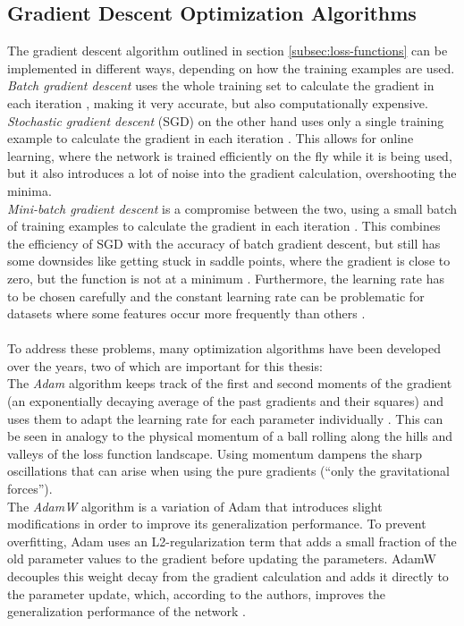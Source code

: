 \subsection{Gradient Descent Optimization Algorithms}
\label{subsec:sgd}
The gradient descent algorithm outlined in section \ref{subsec:loss-functions} can be implemented in different ways, depending on how the training examples are used. 
\\
\textit{Batch gradient descent} uses the whole training set to calculate the gradient in each iteration \cite{ruder_overview_2017}, making it very accurate, but also computationally expensive. \textit{Stochastic gradient descent} (SGD) on the other hand uses only a single training example to calculate the gradient in each iteration \cite{ruder_overview_2017}. This allows for online learning, where the network is trained efficiently on the fly while it is being used, but it also introduces a lot of noise into the gradient calculation, overshooting the minima. 
\\
\textit{Mini-batch gradient descent} is a compromise between the two, using a small batch of training examples to calculate the gradient in each iteration \cite{ruder_overview_2017}. This combines the efficiency of SGD with the accuracy of batch gradient descent, but still has some downsides like getting stuck in saddle points, where the gradient is close to zero, but the function is not at a minimum \cite{ruder_overview_2017}. Furthermore, the learning rate has to be chosen carefully and the constant learning rate can be problematic for datasets where some features occur more frequently than others \cite{ruder_overview_2017}.
\\
\\
To address these problems, many optimization algorithms have been developed over the years, two of which are important for this thesis:
\\
The \textit{Adam} algorithm \cite{kingma_adam_2017} keeps track of the first and second moments of the gradient (an exponentially decaying average of the past gradients and their squares) and uses them to adapt the learning rate for each parameter individually \cite{kingma_adam_2017,ruder_overview_2017}. This can be seen in analogy to the physical momentum of a ball rolling along the hills and valleys of the loss function landscape. Using momentum dampens the sharp oscillations that can arise when using the pure gradients (\enquote{only the gravitational forces}).
\\
The \textit{AdamW} algorithm \cite{loshchilov_decoupled_2019} is a variation of Adam that introduces slight modifications in order to improve its generalization performance. To prevent overfitting, Adam uses an L2-regularization term that adds a small fraction of the old parameter values to the gradient before updating the parameters. AdamW decouples this weight decay from the gradient calculation and adds it directly to the parameter update, which, according to the authors, improves the generalization performance of the network \cite{loshchilov_decoupled_2019}.


